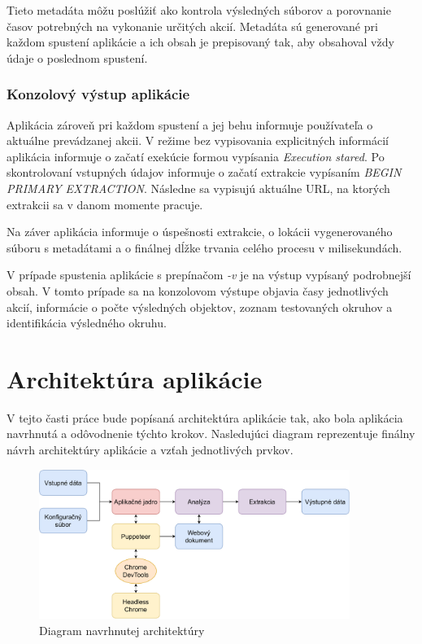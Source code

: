 \bigskip

Tieto metadáta môžu poslúžiť ako kontrola výsledných súborov a porovnanie časov potrebných na vykonanie určitých akcií. Metadáta sú generované pri každom spustení aplikácie a ich obsah je prepisovaný tak, aby obsahoval vždy údaje o poslednom spustení.


\subsubsection{Konzolový výstup aplikácie}

Aplikácia zároveň pri každom spustení a jej behu informuje používateľa o aktuálne prevádzanej akcii. V režime bez vypisovania explicitných informácií aplikácia informuje o začatí exekúcie formou vypísania \textit{Execution stared}.  Po skontrolovaní vstupných údajov informuje o začatí extrakcie vypísaním \textit{BEGIN PRIMARY EXTRACTION}. Následne sa vypisujú aktuálne URL, na ktorých extrakcii sa v danom momente pracuje. 

Na záver aplikácia informuje o úspešnosti extrakcie, o lokácii vygenerovaného súboru s metadátami a o finálnej dĺžke trvania celého procesu v milisekundách.

V prípade spustenia aplikácie s prepínačom \textit{-v} je na výstup vypísaný podrobnejší obsah. V tomto prípade sa na konzolovom výstupe objavia časy jednotlivých akcií, informácie o počte výsledných objektov, zoznam testovaných okruhov a identifikácia výsledného okruhu.

\section{Architektúra aplikácie}

V tejto časti práce bude popísaná architektúra aplikácie tak, ako bola aplikácia navrhnutá a odôvodnenie týchto krokov. Nasledujúci diagram reprezentuje finálny návrh architektúry aplikácie a vzťah jednotlivých prvkov.

\bigskip

\begin{figure}[hbt]
	\centering
	\includegraphics[width=0.9\textwidth]{obrazky-figures/architecture.pdf}
	\caption{Diagram navrhnutej architektúry}
	\label{architecture}
\end{figure}


